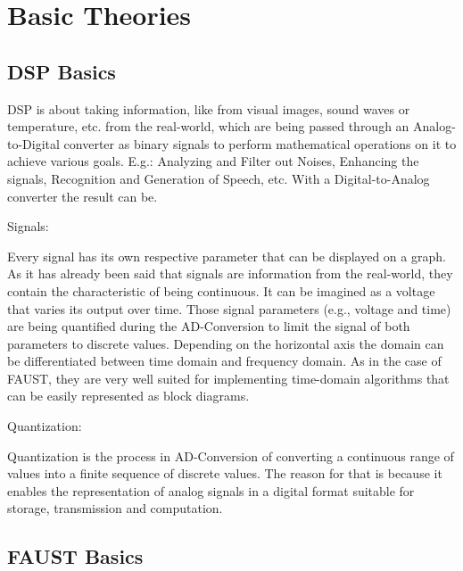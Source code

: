 \chapter {Basic Theories}
\section {DSP Basics}

DSP is about taking information, like from visual images, sound waves or temperature, etc. from the real-world, which are being passed through an Analog-to-Digital converter as binary signals to perform mathematical operations on it to achieve various goals. E.g.: Analyzing and Filter out Noises, Enhancing the signals, Recognition and Generation of Speech, etc. With a Digital-to-Analog converter the result can be. 

Signals: 

Every signal has its own respective parameter that can be displayed on a graph. As it has already been said that signals are information from the real-world, they contain the characteristic of being continuous. It can be imagined as a voltage that varies its output over time. Those signal parameters (e.g., voltage and time) are being quantified during the AD-Conversion to limit the signal of both parameters to discrete values. Depending on the horizontal axis the domain can be differentiated between time domain and frequency domain. As in the case of FAUST, they are very well suited for implementing time-domain algorithms that can be easily represented as block diagrams. 

Quantization: 

Quantization is the process in AD-Conversion of converting a continuous range of values into a finite sequence of discrete values. The reason for that is because it enables the representation of analog signals in a digital format suitable for storage, transmission and computation.  

\section {FAUST Basics}